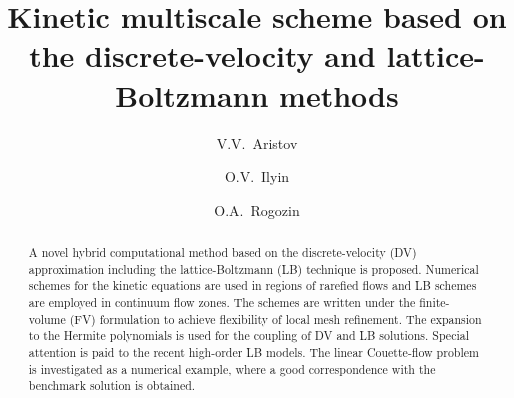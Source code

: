 \documentclass[]{elsarticle} %
\begin{document}
\begin{frontmatter}

\title{Kinetic multiscale scheme based on the discrete-velocity and lattice-Boltzmann methods}

\author[ccas]{V.V.~Aristov}

\author[ccas]{O.V.~Ilyin }

\author[skoltech,ccas]{O.A.~Rogozin}



\address[ccas]{Dorodnicyn Computing Center,
    Federal Research Center "Computer Science and Control" of Russian Academy of Science, Moscow, Russia}
\address[skoltech]{Center for Design, Manufacturing, and Materials,
    Skolkovo Institute of Science and Technology, Skolkovo, Russia}

\begin{abstract}

A novel hybrid computational method based on the discrete-velocity (DV) approximation including the lattice-Boltzmann (LB) technique is proposed.
Numerical schemes for the kinetic equations are used in regions of rarefied flows and LB schemes are employed in continuum flow zones.
The schemes are written under the finite-volume (FV) formulation to achieve flexibility of local mesh refinement.
The expansion to the Hermite polynomials is used for the coupling of DV and LB solutions.
Special attention is paid to the recent high-order LB models.
The linear Couette-flow problem is investigated as a numerical example,
where a good correspondence with the benchmark solution is obtained.






\end{abstract}
\end{frontmatter}
\end{document}
